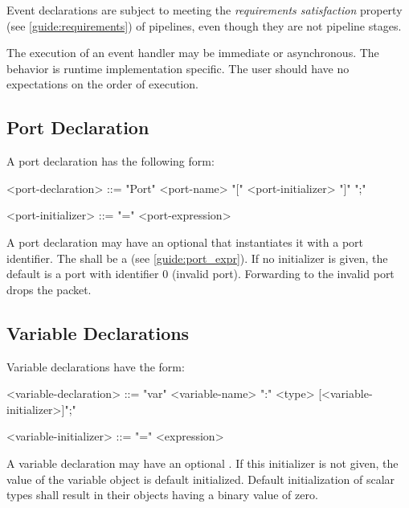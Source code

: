Event declarations are subject to meeting the \textit{requirements satisfaction} property (see \ref{guide:requirements}) of pipelines, even though they are not pipeline stages.

The execution of an event handler may be immediate or asynchronous. The behavior is runtime implementation specific. The user should have no expectations on the order of execution. 

\subsection{Port Declaration} \label{guide:port}

A port declaration has the following form:

\begin{minip}
\begin{grammar}
<port-declaration> ::=
"Port" <port-name> "[" <port-initializer> "]" ";"

<port-initializer> ::= "=" <port-expression>
\end{grammar}
\end{minip}

A port declaration may have an optional  that instantiates it with a port identifier. The  shall be a  (see \ref{guide:port_expr}). If no initializer is given, the default is a port with identifier 0 (invalid port). Forwarding to the invalid port drops the packet.

\subsection{Variable Declarations} \label{guide:variables}

Variable declarations have the form:

\begin{minip}
\begin{grammar}
<variable-declaration> ::=
"var" <variable-name> ":" <type> [<variable-initializer>]";"

<variable-initializer> ::= "=" <expression>
\end{grammar}
\end{minip}

A variable declaration may have an optional . If this initializer is not given, the value of the variable object is default initialized. Default initialization of scalar types shall result in their objects having a binary value of zero.

